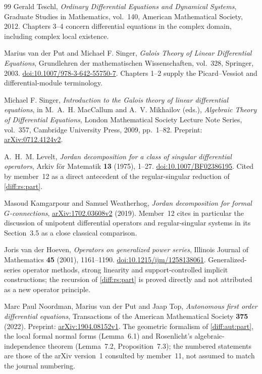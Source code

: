 \documentclass[11pt,letterpaper]{article}
\numberwithin{equation}{section}
\theoremstyle{definition}
\theoremstyle{remark}
\begin{document}
\begin{thebibliography}{99}
Gerald Teschl,
\emph{Ordinary Differential Equations and Dynamical Systems},
Graduate Studies in Mathematics, vol.~140,
American Mathematical Society, 2012.
Chapters 3--4 concern differential equations in the complex domain, including
complex local existence.

Marius van der Put and Michael F. Singer,
\emph{Galois Theory of Linear Differential Equations},
Grundlehren der mathematischen Wissenschaften, vol.~328, Springer, 2003.
\href{https://doi.org/10.1007/978-3-642-55750-7}{doi:10.1007/978-3-642-55750-7}.
Chapters 1--2 supply the Picard--Vessiot and differential-module terminology.

Michael F. Singer,
\emph{Introduction to the Galois theory of linear differential equations},
in M.~A.~H. MacCallum and A.~V. Mikhailov (eds.),
\emph{Algebraic Theory of Differential Equations},
London Mathematical Society Lecture Note Series, vol.~357,
Cambridge University Press, 2009, pp.~1--82.
Preprint: \href{https://arxiv.org/abs/0712.4124}{arXiv:0712.4124v2}.

A.~H.~M. Levelt,
\emph{Jordan decomposition for a class of singular differential operators},
Arkiv f\"or Matematik \textbf{13} (1975), 1--27.
\href{https://doi.org/10.1007/BF02386195}{doi:10.1007/BF02386195}.
Cited by member~12 as a direct antecedent of the regular-singular reduction of
\cref{diff:rs:part}.

Masoud Kamgarpour and Samuel Weatherhog,
\emph{Jordan decomposition for formal $G$-connections},
\href{https://arxiv.org/abs/1702.03608}{arXiv:1702.03608v2} (2019).
Member~12 cites in particular the discussion of unipotent differential operators
and regular-singular systems in its Section~3.5 as a close classical comparison.

Joris van der Hoeven,
\emph{Operators on generalized power series},
Illinois Journal of Mathematics \textbf{45} (2001), 1161--1190.
\href{https://doi.org/10.1215/ijm/1258138061}{doi:10.1215/ijm/1258138061}.
Generalized-series operator methods, strong linearity and support-controlled
implicit constructions; the recursion of \cref{diff:rs:part} is proved directly
and not attributed as a new operator principle.

Marc Paul Noordman, Marius van der Put and Jaap Top,
\emph{Autonomous first order differential equations},
Transactions of the American Mathematical Society \textbf{375} (2022).
Preprint: \href{https://arxiv.org/abs/1904.08152v1}{arXiv:1904.08152v1}. The
geometric formalism of \cref{diff:aut:part}, the local formal normal forms
(Lemma~6.1) and Rosenlicht's algebraic-independence theorem (Lemma~7.2,
Proposition~7.3); the numbered statements are those of the arXiv version~1
consulted by member~11, not assumed to match the journal numbering.


\end{thebibliography}
\end{document}
